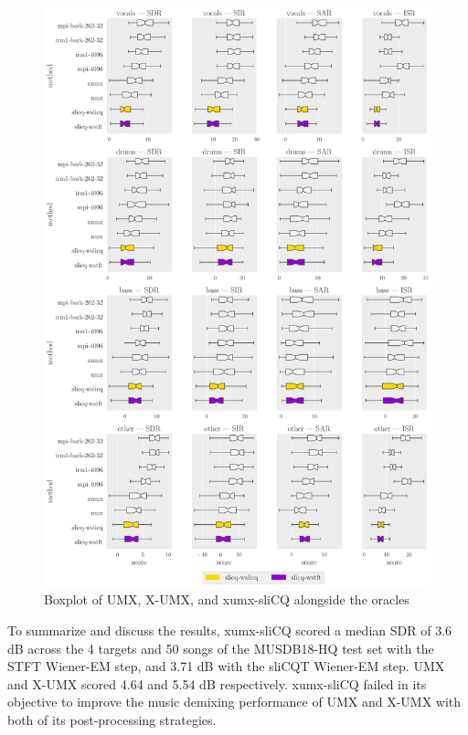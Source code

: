 \documentclass[report.tex]{subfiles}
\begin{document}
\begin{figure}[ht]
	\centering
	\includegraphics[width=\textwidth]{./images-bss/boxplot_full.pdf}
	\caption{Boxplot of UMX, X-UMX, and xumx-sliCQ alongside the oracles}
	\label{fig:bssboxplot}
\end{figure}

To summarize and discuss the results, xumx-sliCQ scored a median SDR of 3.6 dB across the 4 targets and 50 songs of the MUSDB18-HQ test set with the STFT Wiener-EM step, and 3.71 dB with the sliCQT Wiener-EM step. UMX and X-UMX scored 4.64 and 5.54 dB respectively. xumx-sliCQ failed in its objective to improve the music demixing performance of UMX and X-UMX with both of its post-processing strategies.

\newpagefill
\end{document}
